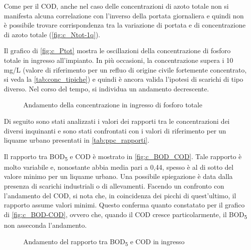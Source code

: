 Come per il COD, anche nel caso delle concentrazioni di azoto totale non si manifesta alcuna correlazione con l'inverso della portata giornaliera e quindi non è possibile trovare corrispondenza tra la variazione di portata e di concentrazione di azoto totale (\autoref{fig:c_Ntot-1q}).

Il grafico di \autoref{fig:c_Ptot} mostra le oscillazioni della concentrazione di fosforo totale in ingresso all’impianto.
In più occasioni, la concentrazione supera i 10 mg/L (valore di riferimento per un refluo di origine civile fortemente concentrato, si veda la \autoref{tab:conc_tipiche}) e quindi è ancora valida l’ipotesi di scarichi di tipo diverso.
Nel corso del tempo, si individua un andamento decrescente.\\

\begin{figure}[H]
		\centering
	\caption{Andamento della concentrazione in ingresso di fosforo totale}
	\label{fig:c_Ptot}
\end{figure}

Di seguito sono stati analizzati i valori dei rapporti tra le concentrazioni dei diversi inquinanti e sono stati confrontati con i valori di riferimento per un liquame urbano presentati in \autoref{tab:ppc_rapporti}.

Il rapporto tra BOD\textsubscript{5} e COD è mostrato in \autoref{fig:c_BOD_COD}.
Tale rapporto è molto variabile e, nonostante abbia media pari a 0,44, spesso è al di sotto del valore minimo per un liquame urbano. Una possibile spiegazione è data dalla presenza di scarichi industriali o di allevamenti.
Facendo un confronto con l’andamento del COD, si nota che, in coincidenza dei picchi di quest’ultimo, il rapporto assume valori minimi. Questo conferma quanto constatato per il grafico di \autoref{fig:c_BOD-COD}, ovvero che, quando il COD cresce particolarmente, il BOD\textsubscript{5} non asseconda l’andamento.\\

\begin{figure}[H]
		\centering
	\caption{Andamento del rapporto tra BOD\textsubscript{5} e COD in ingresso}
	\label{fig:c_BOD_COD}
\end{figure}

